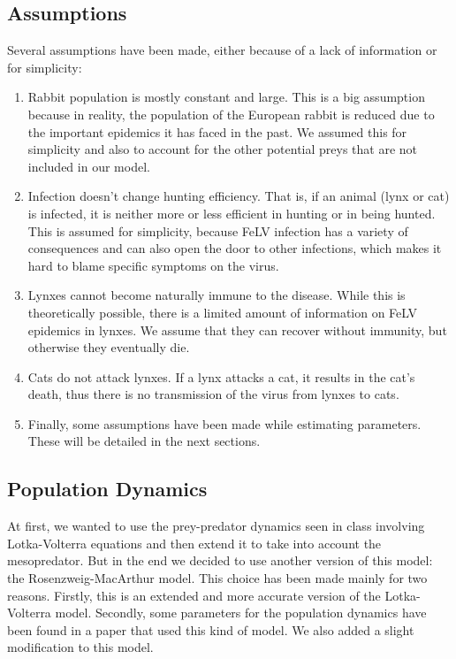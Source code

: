 \documentclass[12pt]{article}
\begin{document}
\subsection{Assumptions}
\quad Several assumptions have been made, either because of a lack of information or for simplicity:
\begin{enumerate}
	\item Rabbit population is mostly constant and large. This is a big assumption because in reality, the population of the European rabbit is reduced due to the important epidemics it has faced in the past. We assumed this for simplicity and also to account for the other potential preys that are not included in our model. \cite{wave_of_chaos}
	\item Infection doesn't change hunting efficiency. That is, if an animal (lynx or cat) is infected, it is neither more or less efficient in hunting or in being hunted. This is assumed for simplicity, because FeLV infection has a variety of consequences and can also open the door to other infections, which makes it hard to blame specific symptoms on the virus.
	\item Lynxes cannot become naturally immune to the disease. While this is theoretically possible, there is a limited amount of information on FeLV epidemics in lynxes. We assume that they can recover without immunity, but otherwise they eventually die. \cite{meli_feline_2010}
	\item Cats do not attack lynxes. If a lynx attacks a cat, it results in the cat's death, thus there is no transmission of the virus from lynxes to cats.
	\item Finally, some assumptions have been made while estimating parameters. These will be detailed in the next sections.
\end{enumerate}
\subsection{Population Dynamics}
\quad At first, we wanted to use the prey-predator dynamics seen in class involving Lotka-Volterra equations and then extend it to take into account the mesopredator. But in the end we decided to use another version of this model: the Rosenzweig-MacArthur model. This choice has been made mainly for two reasons. Firstly, this is an extended and more accurate version of the Lotka-Volterra model. Secondly, some parameters for the population dynamics have been found in a paper that used this kind of model. \cite{wave_of_chaos} We also added a slight modification to this model.
\end{document}
